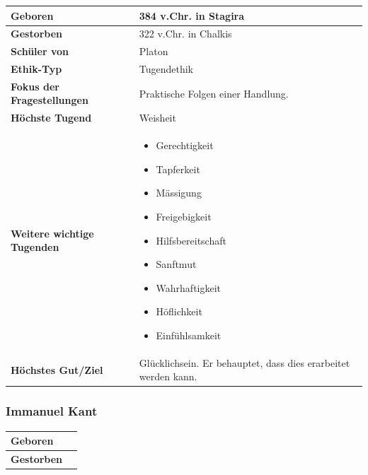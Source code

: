 			\begin{longtable}{>{\bfseries}p{}p{}}
				\hline
				Geboren
					& 384 v.Chr. in Stagira\\
				\hline
				Gestorben
					& 322 v.Chr. in Chalkis\\
				\hline
				Schüler von
					& Platon\\
				\hline
				Ethik-Typ
					& Tugendethik\\
				\hline
				Fokus der Fragestellungen
					& Praktische Folgen einer Handlung.\\
				\hline
				Höchste Tugend
					& Weisheit\\
				\hline
				Weitere wichtige Tugenden
					&	
					\begin{itemize}
						\item Gerechtigkeit
						\item Tapferkeit
						\item Mässigung
						\item Freigebigkeit
						\item Hilfsbereitschaft
						\item Sanftmut
						\item Wahrhaftigkeit
						\item Höflichkeit
						\item Einfühlsamkeit
					\end{itemize}\\
				\hline
				Höchstes Gut/Ziel
					& Glücklichsein. Er behauptet, dass dies erarbeitet werden kann.\\
				\hline
			\end{longtable}	
		
		\subsubsection{Immanuel Kant}
			\begin{longtable}{>{\bfseries}p{}p{}}
				\hline
				Geboren
					& \\
				\hline
				Gestorben
					& \\
				\hline
			\end{longtable}	

